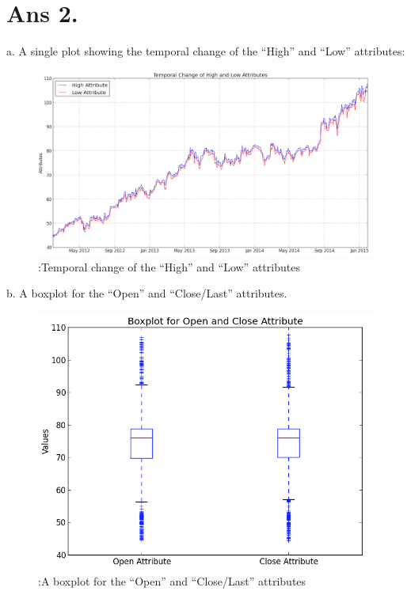 \documentclass[10pt]{article}
\begin{document}
\section*{Ans 2.}
\begin{flushleft}
a. A single plot showing the temporal change of the ``High'' and ``Low'' attributes:\\
\begin{figure}[!htb]
\includegraphics{Plot-1_1}
\caption{:Temporal change of the ``High'' and ``Low'' attributes}   
\label{fig::Temporal change of the ``High'' and ``Low'' attributes} 
\end{figure}
\vspace{30em}
b. A boxplot for the ``Open'' and ``Close/Last'' attributes.\\
\begin{figure}[!htb]
\includegraphics{Plot-2_1}
\caption{:A boxplot for the ``Open'' and ``Close/Last'' attributes}   

\end{figure}
\end{flushleft}
\end{document}
